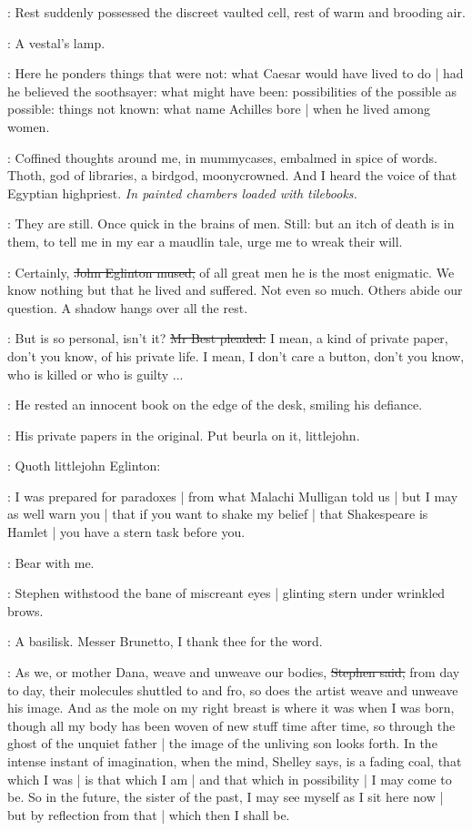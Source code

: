 \StephenInt:
Rest suddenly possessed the discreet vaulted cell,
rest of warm and brooding air.

\StephenInt:
A vestal's lamp.

\StephenInt:
Here he ponders things that were not:
what Caesar would have lived to do |
had he believed the soothsayer:
what might have been:
possibilities of the possible as possible:
things not known:
what name Achilles bore |
when he lived among women.

\StephenInt:
Coffined thoughts around me,
in mummycases,
embalmed in spice of words.
Thoth,
god of libraries,
a birdgod,
moonycrowned.
And I heard the voice of that Egyptian highpriest.
\emph{In painted chambers loaded with tilebooks.}

\StephenInt:
They are still.
Once quick in the brains of men.
Still:
but an itch of death is in them,
to tell me in my ear a maudlin tale,
urge me to wreak their will.

\eglinton:
Certainly,
\sout{John Eglinton mused,}
of all great men he is the most enigmatic.
We know nothing but that he lived and suffered.
Not even so much.
Others abide our question.
A shadow hangs over all the rest.

\best:
But  is so personal,
isn't it?
\sout{Mr Best pleaded.}
I mean,
a kind of private paper,
don't you know,
of his private life.
I mean,
I don't care a button,
don't you know,
who is killed or who is guilty ...

:
He rested an innocent book on the edge of the desk,
smiling his defiance.

\StephenInt:
His private papers in the original.
Put beurla on it,
littlejohn.

:
Quoth littlejohn Eglinton:

\eglinton:
I was prepared for paradoxes |
from what Malachi Mulligan told us |
but I may as well warn you |
that if you want to shake my belief |
that Shakespeare is Hamlet |
you have a stern task before you.

\StephenInt:
Bear with me.

:
Stephen withstood the bane of miscreant eyes |
glinting stern under wrinkled brows.

\StephenInt:
A basilisk.
Messer Brunetto,
I thank thee for the word.

\Stephen:
As we,
or mother Dana,
weave and unweave our bodies,
\sout{Stephen said,}
from day to day,
their molecules shuttled to and fro,
so does the artist weave and unweave his image.
And as the mole on my right breast is where it was when I was born,
though all my body has been woven of new stuff time after time,
so through the ghost of the unquiet father |
the image of the unliving son looks forth.
In the intense instant of imagination,
when the mind,
Shelley says,
is a fading coal,
that which I was |
is that which I am |
and that which in possibility |
I may come to be.
So in the future,
the sister of the past,
I may see myself as I sit here now |
but by reflection from that |
which then I shall be.

